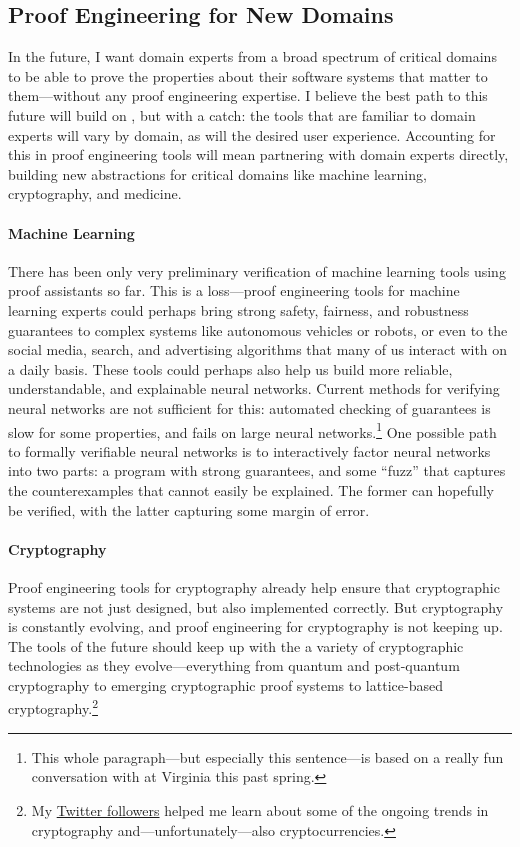 \subsection*{Proof Engineering for New Domains}

In the future, I want domain experts from a broad spectrum of critical domains to be able to prove the properties
about their software systems that matter to them---without any proof engineering expertise.
I believe the best path to this future will build on , but with a catch:
the tools that are familiar to domain experts will vary by domain, as will the desired user experience.
Accounting for this in proof engineering tools will mean partnering with domain experts directly,
building new abstractions for critical domains like machine learning, cryptography, and medicine.

\paragraph{Machine Learning}
There has been only very preliminary verification of machine learning tools using proof assistants so far.
This is a loss---proof engineering tools for machine learning experts could perhaps bring strong safety, fairness, and robustness guarantees to
complex systems like autonomous vehicles or robots, or even to the social media, search, and advertising algorithms that many of us interact with
on a daily basis. These tools could perhaps also help us build more reliable, understandable, and explainable neural networks.
Current methods for verifying neural networks are not sufficient for this: 
automated checking of guarantees is slow for some properties, and fails on large 
neural networks.\footnote{This whole paragraph---but especially this sentence---is based on a really fun conversation with  at Virginia this past spring.}
One possible path to formally verifiable neural networks is to interactively factor neural networks into two parts: a program with strong guarantees,
and some ``fuzz'' that captures the counterexamples that cannot easily be explained.
The former can hopefully be verified, with the latter capturing some margin of error.

\paragraph{Cryptography}
Proof engineering tools for cryptography already help ensure that cryptographic systems are not just designed, but also implemented correctly.
But cryptography is constantly evolving, and proof engineering for cryptography is not keeping up.
The tools of the future should keep up with the a variety of cryptographic technologies as they evolve---everything from quantum and post-quantum cryptography
to emerging cryptographic proof systems to lattice-based cryptography.\footnote{My \href{https://twitter.com/TaliaRinger/status/1391943048465055750}{Twitter followers}
helped me learn about some of the ongoing trends in cryptography and---unfortunately---also cryptocurrencies.} 

